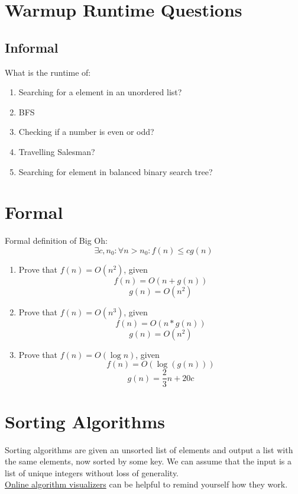 \documentclass[pdf]{article}
\title{}
\author{}
\begin{document}
\maketitle

\section{Warmup Runtime Questions}
\subsection{Informal}
What is the runtime of:
\begin{enumerate}
	\item Searching for a element in an unordered list?
	\item BFS
	\item Checking if a number is even or odd?
	\item Travelling Salesman?
	\item Searching for element in balanced binary search tree?
\end{enumerate}
\section{Formal}
Formal definition of Big Oh:
\[\exists c, n_0 : \forall n > n_0: f(n) \leq cg(n)\]

\begin{enumerate}
	\item Prove that $f(n)=O(n^2)$, given \[f(n)=O(n+g(n))\] \[g(n) = O(n^2)\]
	\item Prove that $f(n)=O(n^3)$, given \[f(n)=O(n*g(n))\] \[g(n) = O(n^2)\]
	\item Prove that $f(n)=O(\log n)$, given \[f(n)=O(\log (g(n)))\] \[g(n) = \frac{2}{3}n + 20c\] 
	
		
\end{enumerate}

\section{Sorting Algorithms}
Sorting algorithms are given an unsorted list of elements and output a list with the same elements, now sorted by some key. We can assume that the input is a list of unique integers without loss of generality.\\
\href{https://visualgo.net/en/sorting}{Online algorithm visualizers} can be helpful to remind yourself how they work.
\end{document}
